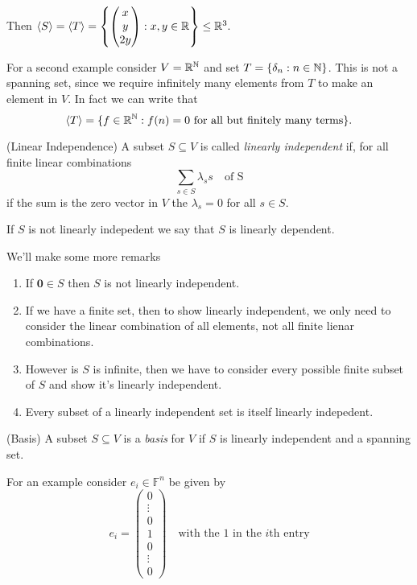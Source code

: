 \documentclass{article}
\newcommand{\F}{\mathbb{F}}
\begin{document}
Then $ \langle S\rangle = \langle T\rangle =\left\{\begin{pmatrix}
  x\\y\\2y
\end{pmatrix}:x,y\in \mathbb{R}\right\} \le \mathbb{R}^3.$\par
For a second example consider $ V=\mathbb{R}^{\mathbb{N}} $ and set $ T=\{\delta_n:n\in \mathbb{N}\} $. This is not a spanning set, since we require infinitely many elements from $ T $ to make an element in $ V $. In fact we can write that
\[
	\langle T\rangle =\{f\in \mathbb{R}^{\mathbb{N}}:f(n)=0\text{ for all but finitely many terms}\}.
\]
\begin{definition}
	(Linear Independence) A subset $ S\subseteq V $ is called \textit{linearly independent} if, for all finite linear combinations
\[
	\sum_{s\in S}\lambda_ss\quad \text{of S}
\]
if the sum is the zero vector in $ V $ the $ \lambda_s=0 $ for all $ s\in S $.
\end{definition}
If $ S $ is not linearly indepedent we say that $ S $ is linearly dependent.\par
We'll make some more remarks
\begin{enumerate}
	\item If $ \mathbf 0 \in S $ then $ S $ is not linearly independent.
	\item If we have a finite set, then to show linearly independent, we only need to consider the linear combination of all elements, not all finite lienar combinations.
	\item However is $ S $ is infinite, then we have to consider every possible finite subset of $ S $ and show it's linearly independent.
	\item Every subset of a linearly independent set is itself linearly indepedent.	
\end{enumerate}
\begin{definition}
	(Basis) A subset $ S\subseteq V $ is a \textit{basis} for $ V $ if $ S $ is linearly independent and a spanning set.
\end{definition}
For an example consider $ e_i\in \F^n $ be given by
\[
  e_i=\begin{pmatrix}
    0\\ \vdots \\ 0 \\ 1 \\ 0 \\\vdots \\ 0
\end{pmatrix}\quad \text{with the 1 in the } i\text{th entry}
\]
\end{document}
